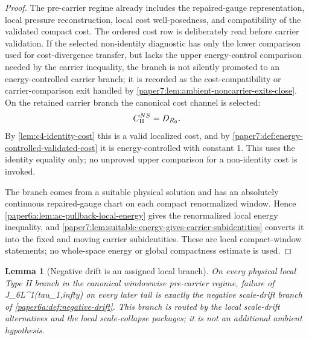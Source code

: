 \documentclass[11pt]{amsart}
\def\({}%
\def\){}%
\def\tilde#1{#1}%
\def\mathfrak#1{#1}%
\def\tau{tau}%
\def\infty{infty}%
\theoremstyle{plain}
\newtheorem{lemma}[lemma]{Lemma}
\theoremstyle{definition}
\theoremstyle{remark}
\begin{document}
\begin{proof}
The pre-carrier regime already includes the repaired-gauge representation,
local pressure reconstruction, local cost well-posedness, and compatibility of
the validated compact cost.  The ordered cost row is deliberately read before
carrier validation.  If the selected non-identity diagnostic has only the lower
comparison used for cost-divergence transfer, but lacks the upper
energy-control comparison needed by the carrier inequality, the branch is not
silently promoted to an energy-controlled carrier branch; it is recorded as the
cost-compatibility or carrier-comparison exit handled by
\cref{paper7:lem:ambient-noncarrier-exits-close}.  On the retained carrier
branch the canonical cost channel is selected:
\[
  \mathfrak C_{\rm II}^{NS}=\tilde{\mathfrak D}_{R_0}.
\]
By \cref{lem:c4-identity-cost} this is a valid localized cost, and by
\cref{paper7:def:energy-controlled-validated-cost} it is energy-controlled
with constant \(1\).  This uses the identity equality only; no unproved
upper comparison for a non-identity cost is invoked.
\par
The branch comes from a suitable physical solution and has an absolutely
continuous repaired-gauge chart on each compact renormalized window.  Hence
\cref{paper6a:lem:ac-pullback-local-energy} gives the renormalized local energy
inequality, and
\cref{paper7:lem:suitable-energy-gives-carrier-subidentities} converts it into
the fixed and moving carrier subidentities.  These are local compact-window
statements; no whole-space energy or global compactness estimate is used.
\end{proof}

\begin{lemma}[Negative drift is an assigned local branch]
\label{paper7:lem:ambient-negative-drift-branch}
On every physical local Type II branch in the canonical windowwise
pre-carrier regime, failure of \(J_6\in L^1(\tau_1,\infty)\) on every later
tail is exactly the negative scale-drift branch of
\cref{paper6a:def:negative-drift}.  This branch is routed by the local
scale-drift alternatives and the local scale-collapse packages; it is not
an additional ambient hypothesis.
\end{lemma}
\end{document}

